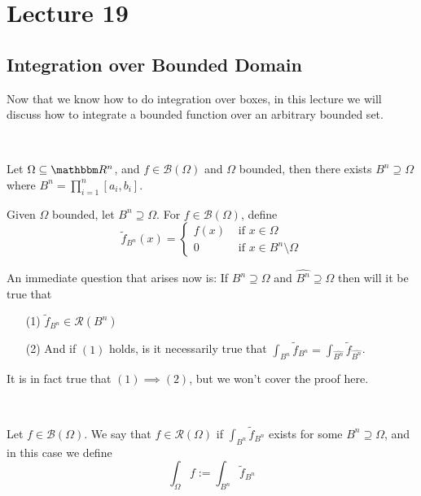 \documentclass[../Analysis-3.tex]{subfiles}
\begin{document}
\chapter*{Lecture 19} %
\setcounter{chapter}{19} %
\setcounter{section}{0}

\section{Integration over Bounded Domain}

Now that we know how to do integration over boxes, in this lecture we will discuss how to integrate a bounded function over an arbitrary bounded set.

\

Let $\Omega \subseteq \R^n$, and $f \in \mathscr{B}(\Omega)$ and $\Omega$ bounded, then there exists $B^n \supseteq \Omega$ where $B^n = \prod_{i=1}^n [a_i, b_i]$.

\begin{Def}{}{}
    Given $\Omega$ bounded, let $B^n \supseteq \Omega$. For $f \in \mathscr{B}(\Omega)$, define
    \[
        \tilde{f}_{B^n}(x) = \begin{cases}
            f(x) & \mbox{ if } x \in \Omega               \\
            0    & \mbox{ if } x \in B^n \setminus \Omega
        \end{cases}
    \]
\end{Def}

An immediate question that arises now is: If $B^n \supseteq \Omega$ and $\hat{B^n} \supseteq \Omega$ then will it be true that
\begin{enumerate}
    \item[(1)] $\tilde{f}_{B^n} \in \mathscr{R}(B^n)$
    \item[(2)] And if $(1)$ holds, is it necessarily true that $\displaystyle{\int_{B^n} \tilde{f}_{B^n} = \int_{\hat{B^n}} \tilde{f}_{\hat{B^n}}}$.
\end{enumerate}
It is in fact true that $(1) \implies (2)$, but we won't cover the proof here.

\

\begin{Def}{}{}
    Let $f \in \mathscr{B}(\Omega)$. We say that $f \in \mathscr{R}(\Omega)$ if $\int_{B^n} \tilde{f}_{B^n}$ exists for some $B^n \supseteq \Omega$, and in this case we define
    \[
        \int_{\Omega} f := \int_{B^n} \tilde{f}_{B^n}
    \]
\end{Def}
\end{document}
